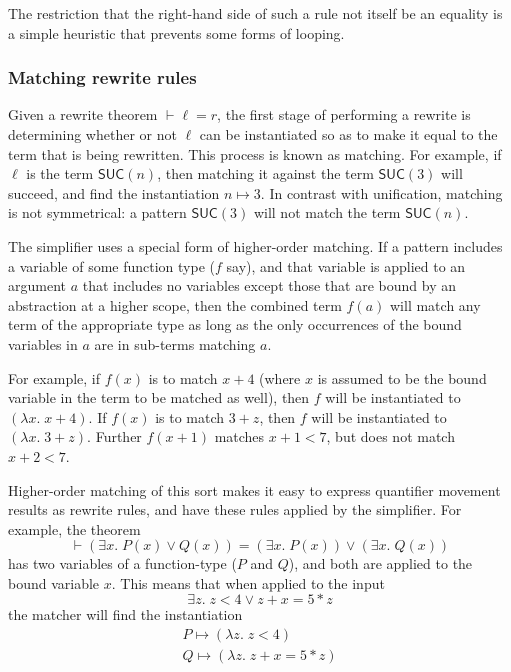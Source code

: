 The restriction that the right-hand side of such a rule not itself be
an equality is a simple heuristic that prevents some forms of looping.






\subsubsection{Matching rewrite rules}
\label{sec:simp-homatch}

Given a rewrite theorem $\vdash \ell = r$, the first stage of
performing a rewrite is determining whether or not $\ell$ can be
instantiated so as to make it equal to the term that is being
rewritten.  This process is known as matching.  For example, if $\ell$
is the term $\textsf{SUC}(n)$, then matching it against the term
$\textsf{SUC}(3)$ will succeed, and find the instantiation $n\mapsto
3$. In contrast with unification, matching is not symmetrical: a
pattern $\textsf{SUC}(3)$ will not match the term $\textsf{SUC}(n)$.

The simplifier uses a special form of higher-order matching.  If a
pattern includes a variable of some function type ($f$ say), and that
variable is applied to an argument $a$ that includes no variables
except those that are bound by an abstraction at a higher scope, then
the combined term $f(a)$ will match any term of the appropriate type
as long as the only occurrences of the bound variables in $a$ are in
sub-terms matching $a$.

For example, if $f(x)$ is to match $x + 4$ (where $x$ is assumed to be
the bound variable in the term to be matched as well), then $f$ will
be instantiated to $(\lambda x.\; x + 4)$.  If $f(x)$ is to match $3 +
z$, then $f$ will be instantiated to $(\lambda x.\;3 + z)$.  Further $f(x +
1)$ matches $x + 1 < 7$, but does not match $x + 2 < 7$.

Higher-order matching of this sort makes it easy to express quantifier
movement results as rewrite rules, and have these rules applied by the
simplifier.  For example, the theorem
\[
\vdash (\exists x. \;P(x)\lor Q(x)) = (\exists x.\;P(x)) \lor (\exists
x.\;Q(x))
\]
has two variables of a function-type ($P$ and $Q$), and both are
applied to the bound variable $x$.  This means that when applied to
the input \[
\exists z. \;z < 4 \lor z + x = 5 * z
\]
the matcher will find the instantiation \[
\begin{array}{l}
P \mapsto (\lambda z.\;z < 4)\\
Q \mapsto (\lambda z.\;z + x = 5 * z)
\end{array}
\]

